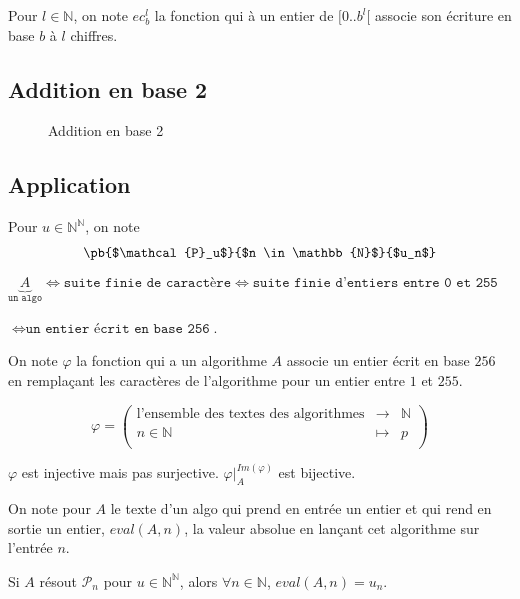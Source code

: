 \documentclass{scrartcl}
\begin{document}
				Pour $l \in \mathbb{N}$, on note $ec_b^l$ la fonction qui à un entier de $[0..b^l[$ associe son écriture en base $b$ à $l$ chiffres.

		\subsection{Addition en base 2}

			\begin{figure}[H]
				\centering
				\caption{Addition en base 2}
				\hfill
			\end{figure}

		\subsection{Application}

			Pour $u \in \mathbb{N}^{\mathbb{N}}$, on note
			\[
				\pb{$\mathcal{P}_u$}{$n \in \mathbb{N}$}{$u_n$}
			\]
			$\underbrace{A}_{\texttt{un algo}} \iff \texttt{suite finie de caractère} 
			\iff \texttt{suite finie d'entiers entre 0 et 255}$

			$\iff \texttt{un entier écrit en base 256}$.

			On note $\varphi$ la fonction qui a un algorithme $A$ associe un entier écrit en base $256$ 
			en remplaçant les caractères de l'algorithme pour un entier entre $1$ et $255$.

			\[
			\varphi = \left( \begin{array}{ccc}
			\textrm{l'ensemble des textes des algorithmes} & \to & \mathbb{N} \\
			n \in \mathbb{N} & \mapsto & p \\
			\end{array} \right)
			\]

			$\varphi$ est injective mais pas surjective. $\varphi \Big|_{A}^{Im(\varphi)}$ est bijective.

			On note pour $A$ le texte d'un algo qui prend en entrée un entier et qui rend en sortie un entier, $eval(A,n)$, la valeur
			absolue en lançant cet algorithme sur l'entrée $n$.

			\rem Si $A$ résout $\mathcal{P}_n$ pour $u \in \mathbb{N}^{\mathbb{N}}$, alors $\forall n \in \mathbb{N}$, 
			$eval(A,n) = u_n$.
\end{document}
